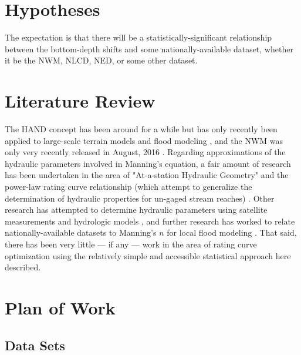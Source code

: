 \documentclass[11pt]{article}
\begin{document}
\section*{Hypotheses} %

The expectation is that there will be a statistically-significant relationship between the bottom-depth shifts and some nationally-available dataset, whether it be the NWM, NLCD, NED, or some other dataset.  

\section*{Literature Review} %

The HAND concept has been around for a while but has only recently been applied to large-scale terrain models \cite{handpaper} and flood modeling \cite{nfiehand}, and the NWM was only very recently released in August, 2016 \cite{nwmsummary}. Regarding approximations of the hydraulic parameters involved in Manning's equation, a fair amount of research has been undertaken in the area of "At-a-station Hydraulic Geometry" and the power-law rating curve relationship (which attempt to generalize the determination of hydraulic properties for un-gaged stream reaches) \cite{ahgdingman, ahgchen}. Other research has attempted to determine hydraulic parameters using satellite measurements and hydrologic models \cite{sathydroparams}, and further research has worked to relate nationally-available datasets to Manning's $n$ for local flood modeling \cite{ahgmoore}. That said, there has been very little --- if any --- work in the area of rating curve optimization using the relatively simple and accessible statistical approach here described. 

\section*{Plan of Work} %

  \subsection*{Data Sets} %
\end{document}
